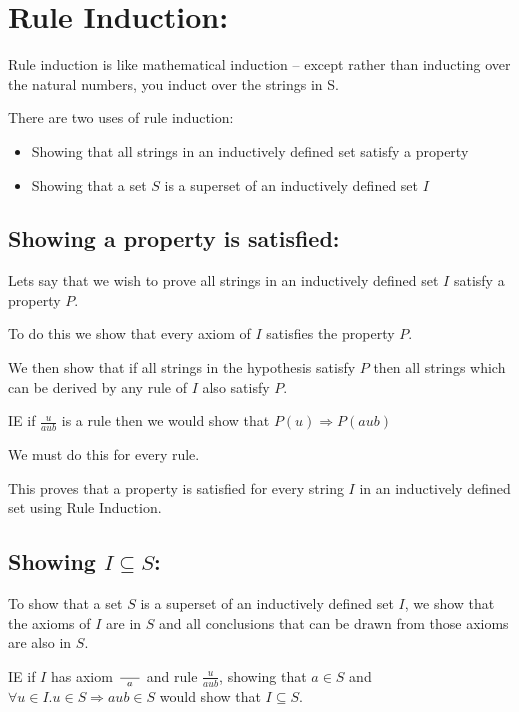 \documentclass[10pt,\jkfside,a4paper]{article}
\begin{document}
\section*{Rule Induction:}

Rule induction is like mathematical induction -- except rather than inducting over the 
natural numbers, you induct over the strings in S.

There are two uses of rule induction:

\begin{itemize}

\item Showing that all strings in an inductively defined set satisfy a property

\item Showing that a set $S$ is a superset of an inductively defined set $I$

\end{itemize}

\subsection*{Showing a property is satisfied:}

Lets say that we wish to prove all strings in an inductively defined set $I$ 
satisfy a property $P$.

To do this we show that every axiom of $I$ satisfies the property $P$.

We then show that if all strings in the hypothesis satisfy $P$ then all strings which 
can be derived by any rule of $I$ also satisfy $P$.

IE if $\frac{u}{aub}$ is a rule then we would show that $P(u) \Longrightarrow P(aub)$

We must do this for every rule. 

This proves that a property is satisfied for every string $I$ in an inductively defined set 
using Rule Induction.

\subsection*{Showing $I \subseteq S$:}

To show that a set $S$ is a superset of an inductively defined set $I$, we show that the 
axioms of $I$ are in $S$ and all conclusions that can be drawn from those axioms are also in 
$S$.

IE if $I$ has axiom $\frac{\hspace{0.5cm}}{a}$ and rule $\frac{u}{aub}$, showing that 
$a \in S$ and $\forall u \in I. u \in S \Longrightarrow aub \in S$ would show that $I \subseteq S$.
\end{document}
